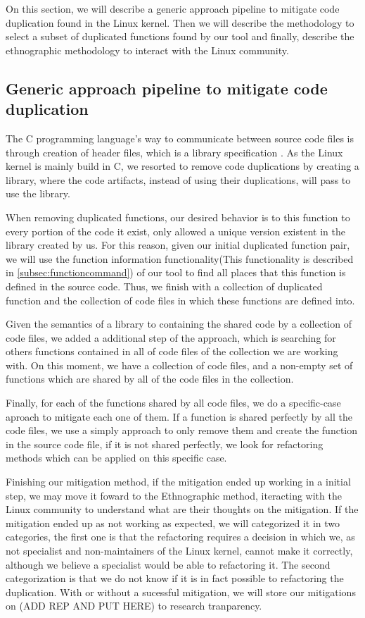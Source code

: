 On this section, we will describe a generic approach pipeline to mitigate code duplication found in the Linux kernel. Then we
will describe the methodology to select a subset of duplicated functions found by our tool and finally, describe the ethnographic
methodology to interact with the Linux community.


\subsection{Generic approach pipeline to mitigate code duplication}

\label{subsec:pipeline}

The C programming language's way to communicate between source code files is through creation of header files, which is
a library specification \citep{Cbook}. As the Linux kernel is mainly build in C, we resorted to remove code duplications by
creating a library, where the code artifacts, instead of using their duplications, will pass to use the library.

When removing duplicated functions, our desired behavior is to this function to every portion of the code it exist, only allowed a
unique version existent in the library created by us. For this reason, given our initial duplicated function pair, we will use 
the function information functionality(This functionality is described in \ref{subsec:functioncommand}) of our tool to find all 
places that this function is defined in the source code. Thus, we finish with a collection of duplicated function and the collection
of code files in which these functions are defined into.

Given the semantics of a library to containing the shared code by a collection of code files, we added a additional step of the 
approach, which is searching for others functions contained in all of code files of the collection we are working with. 
On this moment, we have a collection of code files, and a non-empty set of functions which are shared by all of the code files 
in the collection.

Finally, for each of the functions shared by all code files, we do a specific-case aproach to mitigate each one of them.
If a function is shared perfectly by all the code files, we use a simply approach to only remove them and create the function in
the source code file, if it is not shared perfectly, we look for refactoring methods which can be applied on this specific case. 

Finishing our mitigation method, if the mitigation ended up working in a initial step, we may move it foward to the 
Ethnographic method, iteracting with the Linux community to understand what are their thoughts on the mitigation. If the mitigation
ended up as not working as expected, we will categorized it in two categories, the first one is that the refactoring requires a
decision in which we, as not specialist and non-maintainers of the Linux kernel, cannot make it correctly, although
we believe a specialist would be able to refactoring it. The second categorization is that we do not know if it is in fact possible
to refactoring the duplication. With or without a sucessful mitigation, we will store our mitigations on (ADD REP AND PUT HERE) 
to research tranparency.

